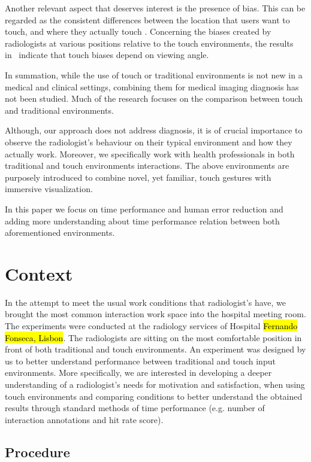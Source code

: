 \documentclass{sigchi}
\begin{document}
Another relevant aspect that deserves interest is the presence of bias.
This can be regarded as the consistent differences between the location that users want to touch, and where they actually touch
\cite{beringer1985underlying, beringer1989operator}. Concerning the biases  created by radiologists at various positions relative to the touch environments, the results in~\cite{hall1988factors} indicate that touch biases depend on viewing angle.

In summation, while the use of touch or traditional environments is not new in a medical and clinical settings, combining them for medical imaging diagnosis has not been studied. Much of the research focuses on the comparison between touch and traditional environments. 

Although, our approach does not address diagnosis, it is of crucial importance to observe the radiologist's behaviour on their typical environment and how they actually work. Moreover, we specifically work with health professionals in both traditional and touch environments interactions. The above environments are  purposely introduced to combine novel, yet familiar, touch gestures with immersive visualization.

In this paper we focus on time performance and human error reduction and adding more understanding about time performance relation between both aforementioned environments.

\section{Context}

In the attempt to meet the usual work conditions that radiologist's have,  we brought the most common interaction work space into the hospital meeting room. The experiments were conducted at the radiology services of Hospital \hl{Fernando Fonseca, Lisbon}. The radiologists are sitting on the most comfortable position in front of both traditional and touch environments. An experiment was designed by us to better understand performance between traditional and touch input environments. More specifically, we are interested in developing a deeper understanding of a radiologist's needs for motivation and satisfaction, when using touch environments and comparing conditions to better understand the obtained results through standard methods of time performance (e.g. number of interaction annotations and hit rate score).

\subsection{Procedure}
\end{document}
